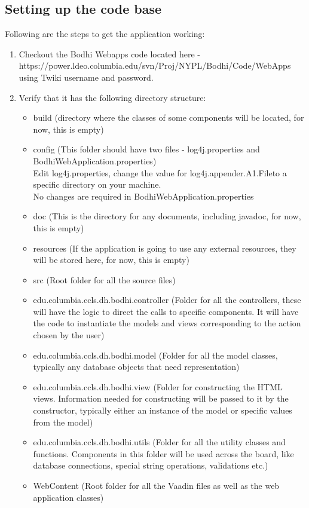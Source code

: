 \documentclass[amsart, 12pt]{article}
\begin{document}
\subsection{Setting up the code base}
Following are the steps to get the application working:
\begin{enumerate}
\item Checkout the Bodhi Webapps code located here -\\ https://power.ldeo.columbia.edu/svn/Proj/NYPL/Bodhi/Code/WebApps using Twiki username and password.

\item Verify that it has the following directory structure:
\begin{itemize}
    \item build (directory where the classes of some components will be located, for now, this is empty)
\item config (This folder should have two files - log4j.properties and BodhiWebApplication.properties)\\
Edit log4j.properties, change the value for \textasciigrave log4j.appender.A1.File\textasciiacute to a specific directory on your machine.\\
No changes are required in BodhiWebApplication.properties
\item doc (This is the directory for any documents, including javadoc, for now, this is empty)
\item resources (If the application is going to use any external resources, they will be stored here, for now, this is empty)
\item src (Root folder for all the source files)
\item edu.columbia.ccls.dh.bodhi.controller (Folder for all the controllers, these will have the logic to direct the calls to specific components. It will have the code to instantiate the models and views corresponding to the action chosen by the user)
\item edu.columbia.ccls.dh.bodhi.model (Folder for all the model classes, typically any database objects that need representation)
\item edu.columbia.ccls.dh.bodhi.view (Folder for constructing the HTML views. Information needed for constructing will be passed to it by the constructor, typically either an instance of the model or specific values from the model)
\item edu.columbia.ccls.dh.bodhi.utils (Folder for all the utility classes and functions. Components in this folder will be used across the board, like database connections, special string operations, validations etc.)
\item WebContent (Root folder for all the Vaadin files as well as the web application classes)
\end{itemize}


\end{enumerate}
\end{document}
